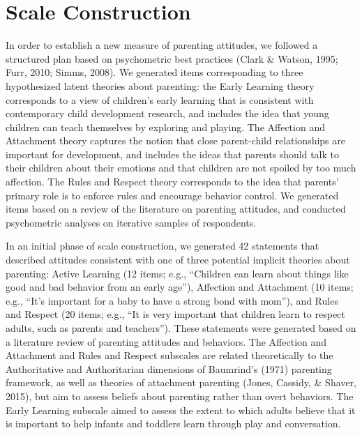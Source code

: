 \documentclass[10pt, letterpaper]{article}
\begin{document}
\section{Scale Construction}\label{scale-construction}

In order to establish a new measure of parenting attitudes, we followed
a structured plan based on psychometric best practices (Clark \& Watson,
1995; Furr, 2010; Simms, 2008). We generated items corresponding to
three hypothesized latent theories about parenting: the Early Learning
theory corresponds to a view of children's early learning that is
consistent with contemporary child development research, and includes
the idea that young children can teach themselves by exploring and
playing. The Affection and Attachment theory captures the notion that
close parent-child relationships are important for development, and
includes the ideas that parents should talk to their children about
their emotions and that children are not spoiled by too much affection.
The Rules and Respect theory corresponds to the idea that parents'
primary role is to enforce rules and encourage behavior control. We
generated items based on a review of the literature on parenting
attitudes, and conducted psychometric analyses on iterative samples of
respondents.

In an initial phase of scale construction, we generated 42 statements
that described attitudes consistent with one of three potential implicit
theories about parenting: Active Learning (12 items; e.g., ``Children
can learn about things like good and bad behavior from an early age''),
Affection and Attachment (10 items; e.g., ``It's important for a baby to
have a strong bond with mom''), and Rules and Respect (20 items; e.g.,
``It is very important that children learn to respect adults, such as
parents and teachers''). These statements were generated based on a
literature review of parenting attitudes and behaviors. The Affection
and Attachment and Rules and Respect subscales are related theoretically
to the Authoritative and Authoritarian dimensions of Baumrind's (1971)
parenting framework, as well as theories of attachment parenting (Jones,
Cassidy, \& Shaver, 2015), but aim to assess beliefs about parenting
rather than overt behaviors. The Early Learning subscale aimed to assess
the extent to which adults believe that it is important to help infants
and toddlers learn through play and conversation.
\end{document}

